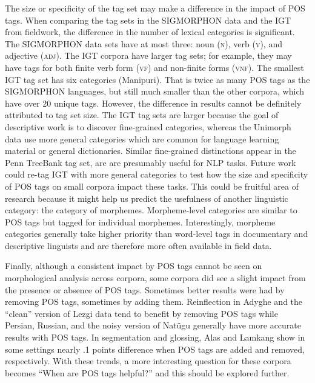 The size or specificity of the tag set may make a difference in the impact of POS tags. When comparing the tag sets in the SIGMORPHON data and the IGT from fieldwork, the difference in the number of lexical categories is significant. The SIGMORPHON data sets have at most three: noun (\textsc{n}), verb (\textsc{v}), and adjective (\textsc{adj}). The IGT corpora have larger tag sets; for example, they may have tags for both finite verb form (\textsc{vf}) and non-finite forms (\textsc{vnf}). The smallest IGT tag set has six categories (Manipuri). That is twice as many POS tags as the SIGMORPHON languages, but still much smaller than the other corpora, which have over 20 unique tags.  However, the difference in results cannot be definitely attributed to tag set size. The IGT tag sets are larger because the goal of descriptive work is to discover fine-grained categories, whereas the Unimorph data use more general categories which are common for language learning material or general dictionaries. Similar fine-grained distinctions appear in the Penn TreeBank tag set, are are presumably useful for NLP tasks.
Future work could re-tag IGT with more general categories to test how the size and specificity of POS tags on small corpora impact these tasks. This could be fruitful area of research because it might help us predict the usefulness of another linguistic category: the category of morphemes. Morpheme-level categories are similar to POS tags but tagged for individual morphemes. Interestingly, morpheme categories generally take higher priority than word-level tags in documentary and descriptive linguists and are therefore more often available in field data.



Finally, although a consistent impact by POS tags cannot be seen on morphological analysis across corpora, some corpora did see a slight impact from the presence or absence of POS tags. Sometimes better results were had by removing POS tags, sometimes by adding them. Reinflection in Adyghe and the ``clean'' version of Lezgi data tend to benefit by removing POS tags while Persian, Russian, and the noisy version of Nat\"ugu generally have more accurate results with POS tags. In segmentation and glossing, Alas and Lamkang show in some settings nearly .1 points difference when POS tags are added and removed, respectively. With these trends, a more interesting question for these corpora becomes ``When are POS tags helpful?'' and this should be explored further. 


